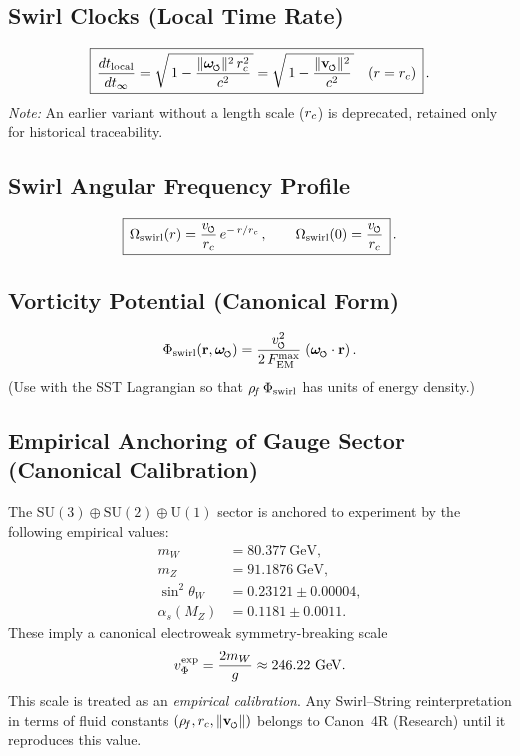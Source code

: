 \documentclass[11pt]{article}
\begin{document}
\subsection*{Swirl Clocks (Local Time Rate)}
    \[
        \boxed{\,\frac{dt_{\text{local}}}{dt_{\infty}}
            = \sqrt{\,1 - \frac{\|\omegas\|^2\,\rc^2}{c^2}\,}
            = \sqrt{\,1 - \frac{\|\vswirl\|^2}{c^2}\,}\quad (r=\rc)\,}\,.
    \]
    \emph{Note:} An earlier variant without a length scale ($r_c$) is deprecated, retained only for historical traceability.

\subsection*{Swirl Angular Frequency Profile}
    \[
        \boxed{\,\Omega_{\text{swirl}}(r) = \frac{\vscore}{\rc}\,e^{-\,r/\rc}\,,\qquad \Omega_{\text{swirl}}(0)=\frac{\vscore}{\rc}\,}\,.
    \]

\subsection*{Vorticity Potential (Canonical Form)}
\[
	\Phi_{\text{swirl}}(\mathbf{r},\omegas) = \frac{\vscore^2}{2\,F_{\text{EM}}^{\max}}\;(\omegas\cdot \mathbf{r})\,.
\]
(Use with the SST Lagrangian so that $\rho_{\!f}\,\Phi_{\text{swirl}}$ has units of energy density.)


\subsection{Empirical Anchoring of Gauge Sector (Canonical Calibration)}
The $\mathrm{SU}(3)\oplus \mathrm{SU}(2)\oplus \mathrm{U}(1)$ sector is anchored to experiment by the
following empirical values:
\begin{align}
	m_W &= 80.377~\mathrm{GeV}, \\
	m_Z &= 91.1876~\mathrm{GeV}, \\
	\sin^2\theta_W &= 0.23121 \pm 0.00004, \\
	\alpha_s(M_Z) &= 0.1181 \pm 0.0011 .
\end{align}
These imply a canonical electroweak symmetry-breaking scale
\begin{equation}
	v_\Phi^{\rm exp} = \frac{2 m_W}{g} \approx 246.22~\mathrm{GeV}.
\end{equation}
This scale is treated as an \emph{empirical calibration}. Any Swirl--String reinterpretation
in terms of fluid constants $(\rho_{\!f}, r_c, \lVert \vswirl \rVert)$ belongs to
Canon~4R (Research) until it reproduces this value.
\end{document}
